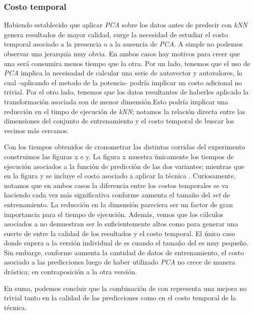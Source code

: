 \subsubsection{Costo temporal}
Habiendo establecido que aplicar \emph{PCA} sobre los datos antes de predecir con \emph{kNN} genera resultados de mayor calidad, surge la necesidad de estudiar el costo temporal asociado a la presencia o a la ausencia de \emph{PCA}. A simple no podemos observar una jerarquía muy obvia. En ambos casos hay motivos para creer que una será consumira menos tiempo que la otra. Por un lado, tenemos que el uso de \emph{PCA} implica la neceisadad de calcular una serie de autovector y autovalores, lo cual -aplicando el metodo de la potencia- podría implicar un costo adicional no trivial. Por el otro lado, tenemos que los datos resultantes de haberles aplicado la transformación asociada son de menor dimensión.Esto podría implicar una reducción en el timpo de ejecución de \emph{kNN}; notamos la relación directa entre las dimensiones del conjunto de entrenamiento y el costo temporal de buscar los vecinos más cercanos.
\par
Con los tiempos obtenidos de cronometrar las distintas corridas del experimento construimos las figuras x e y. La figura x muestra únicamente los tiempos de ejecución asociados a la función de predicción de las dos variantes; mientras que en la figura y se incluye el costo asociado a aplicar la técnica . Curiosamente, notamos que en ambos casos la diferencia entre los costos temporales se va haciendo cada vez más significativa conforme aumenta el tamaño del \emph{set} de entrenamiento. La reducción en la dimensión pareciera ser un factor de gran importancia para el tiempo de ejecución. Además, vemos que los cálculos asociados a  no demuestran ser lo suficientemente altos como para generar una suerte de  entre la calidad de los resultados y el costo temporal. El único caso donde supera a la versión individual de  es cuando el tamaño del  es muy pequeño. Sin embarge, conforme aumenta la cantidad de datos de entrenamiento, el costo asociado a las predicciones luego de haber utilizado \emph{PCA} no crece de manera drástica; en contraposición a la otra versión.
\par
En suma, podemos concluir que la combinación de  con  representa una mejora no trivial tanto en la calidad de las predicciones como en el costo temporal de la técnica. 
